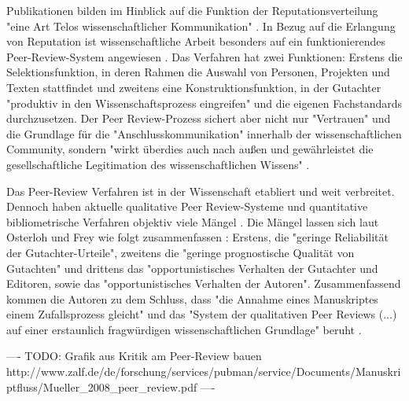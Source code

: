 Publikationen bilden im Hinblick auf die Funktion der Reputationsverteilung "eine Art Telos wissenschaftlicher Kommunikation" \cite{hirschauer2004peer}. In Bezug auf die Erlangung von Reputation ist wissenschaftliche Arbeit besonders auf ein funktionierendes Peer-Review-System angewiesen \cite{suchen}. Das Verfahren hat zwei Funktionen: Erstens die Selektionsfunktion, in deren Rahmen die Auswahl von Personen, Projekten und Texten stattfindet und zweitens eine Konstruktionsfunktion, in der Gutachter "produktiv in den Wissenschaftsprozess eingreifen" \cite{Neidhardt_2010} und die eigenen Fachstandards durchzusetzen. Der Peer Review-Prozess sichert aber nicht nur "Vertrauen" und die Grundlage für die "Anschlusskommunikation" innerhalb der wissenschaftlichen Community, sondern "wirkt überdies auch nach außen und gewährleistet die gesellschaftliche Legitimation des wissenschaftlichen Wissens" \cite{pscheida_2010_wikipedia}.

Das Peer-Review Verfahren ist in der Wissenschaft etabliert und weit verbreitet. Dennoch haben aktuelle qualitative Peer Review-Systeme und quantitative bibliometrische Verfahren objektiv viele Mängel \cite{osterloh2008anreize} \cite{Lee_2012} \cite{Jansen_2007}. Die Mängel lassen sich laut Osterloh und Frey wie folgt zusammenfassen \cite{osterloh2008anreize}: Erstens, die "geringe Reliabilität der Gutachter-Urteile", zweitens die "geringe prognostische Qualität von Gutachten" und drittens das "opportunistisches Verhalten der Gutachter und Editoren, sowie das "opportunistisches Verhalten der Autoren". Zusammenfassend kommen die Autoren zu dem Schluss, dass "die Annahme eines Manuskriptes einem Zufallsprozess gleicht" und das "System der qualitativen Peer Reviews (...) auf einer erstaunlich fragwürdigen wissenschaftlichen Grundlage" beruht \cite{osterloh2008anreize}.

---- TODO: Grafik aus Kritik am Peer-Review bauen http://www.zalf.de/de/forschung/services/pubman/service/Documents/Manuskriptfluss/Mueller_2008_peer_review.pdf ----

